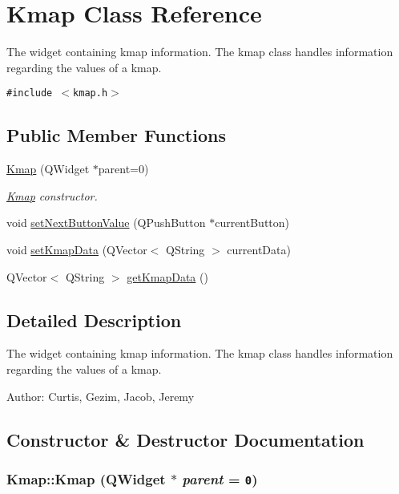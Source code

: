 \hypertarget{classKmap}{
\section{Kmap Class Reference}
\label{classKmap}
}
The widget containing kmap information. The kmap class handles information regarding the values of a kmap.  


{\tt \#include $<$kmap.h$>$}

\subsection*{Public Member Functions}
\begin{CompactItemize}
\item 
\hyperlink{classKmap_65498308537f51ca27db6222ed358625}{Kmap} (QWidget $\ast$parent=0)
\begin{CompactList}\small\item\em \hyperlink{classKmap}{Kmap} constructor. \item\end{CompactList}\item 
void \hyperlink{classKmap_219aee8c1737391460c45c70db9af238}{setNextButtonValue} (QPushButton $\ast$currentButton)
\item 
void \hyperlink{classKmap_a1f56e49fd450b8ddcc3000ae897dc9b}{setKmapData} (QVector$<$ QString $>$ currentData)
\item 
QVector$<$ QString $>$ \hyperlink{classKmap_f04c56bae31de2f5419b8b97b4e92433}{getKmapData} ()
\end{CompactItemize}


\subsection{Detailed Description}
The widget containing kmap information. The kmap class handles information regarding the values of a kmap. 

\begin{Desc}
\item[Author:]Curtis, Gezim, Jacob, Jeremy \end{Desc}


\subsection{Constructor \& Destructor Documentation}
\hypertarget{classKmap_65498308537f51ca27db6222ed358625}{
\subsubsection[Kmap]{\setlength{\rightskip}{0pt plus 5cm}Kmap::Kmap (QWidget $\ast$ {\em parent} = {\tt 0})}}
\label{classKmap_65498308537f51ca27db6222ed358625}



